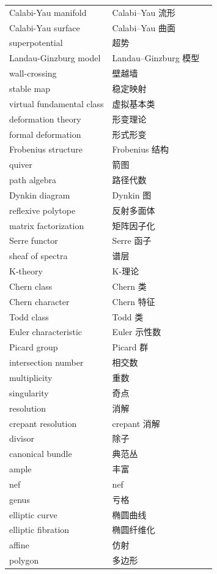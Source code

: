 \documentclass[11pt,a4paper]{article}
\theoremstyle{cnth}
\begin{document}
{\begin{longtable}{p{5.0cm}p{5.6cm}p{3.6cm}}
Calabi-Yau manifold & Calabi–Yau 流形 &  \\
Calabi-Yau surface & Calabi–Yau 曲面 &  \\
superpotential & 超势 &  \\
Landau-Ginzburg model & Landau–Ginzburg 模型 &  \\
wall-crossing & 壁越墙 &  \\
stable map & 稳定映射 &  \\
virtual fundamental class & 虚拟基本类 &  \\
deformation theory & 形变理论 &  \\
formal deformation & 形式形变 &  \\
Frobenius structure & Frobenius 结构 &  \\
quiver & 箭图 &  \\
path algebra & 路径代数 &  \\
Dynkin diagram & Dynkin 图 &  \\
reflexive polytope & 反射多面体 &  \\
matrix factorization & 矩阵因子化 &  \\
Serre functor & Serre 函子 &  \\
sheaf of spectra & 谱层 &  \\
K-theory & K-理论 &  \\
Chern class & Chern 类 &  \\
Chern character & Chern 特征 &  \\
Todd class & Todd 类 &  \\
Euler characteristic & Euler 示性数 &  \\
Picard group & Picard 群 &  \\
intersection number & 相交数 &  \\
multiplicity & 重数 &  \\
singularity & 奇点 &  \\
resolution & 消解 &  \\
crepant resolution & crepant 消解 &  \\
divisor & 除子 &  \\
canonical bundle & 典范丛 &  \\
ample & 丰富 &  \\
nef & nef &  \\
genus & 亏格 &  \\
elliptic curve & 椭圆曲线 &  \\
elliptic fibration & 椭圆纤维化 &  \\
affine & 仿射 &  \\
polygon & 多边形 &  \\

\end{longtable}}
\end{document}
